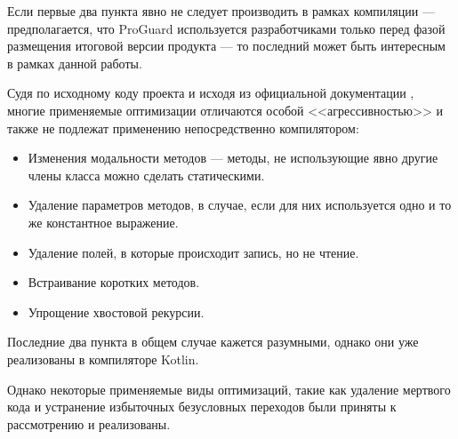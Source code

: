 Если первые два пункта явно не следует производить в рамках компиляции --- предполагается,
что ProGuard используется разработчиками только перед фазой размещения итоговой версии продукта ---
то последний может быть интересным в рамках данной работы.

Судя по исходному коду проекта и исходя из официальной документации ,
многие применяемые оптимизации отличаются особой <<агрессивностью>> и также не подлежат
применению непосредственно компилятором:
\begin{itemize}
    \item Изменения модальности методов --- методы, не использующие явно другие члены класса можно
    сделать статическими.
    \item Удаление параметров методов, в случае, если для них используется одно и то же константное
    выражение.
    \item Удаление полей, в которые происходит запись, но не чтение.
    \item Встраивание коротких методов.
    \item Упрощение хвостовой рекурсии.
\end{itemize}

Последние два пункта в общем случае кажется разумными, однако они уже реализованы в компиляторе
Kotlin.

Однако некоторые применяемые виды оптимизаций, такие как удаление мертвого кода
и устранение избыточных безусловных переходов были приняты к рассмотрению и реализованы.
